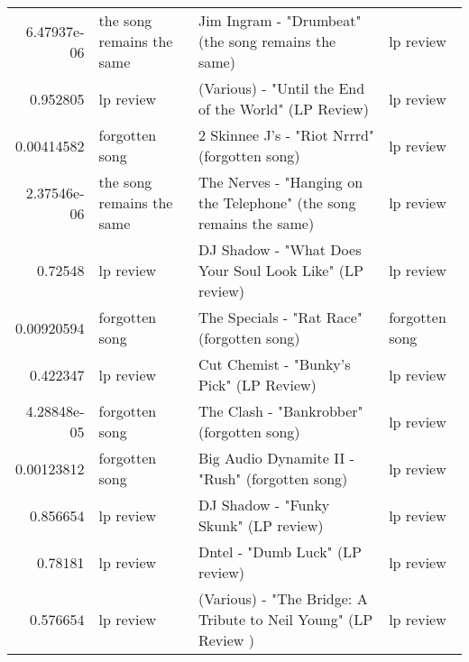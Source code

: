 \documentclass[letterpaper,10pt]{article}
\begin{document}
\begin{table}[H]
\begin{adjustbox}{max width=\linewidth}
\begin{tabular}{rlll}
  6.47937e-06 & the song remains the same & Jim Ingram - "Drumbeat" (the song remains the same)                                                          & lp review                 \\
  0.952805    & lp review                 & (Various) - "Until the End of the World" (LP Review)                                                         & lp review                 \\
  0.00414582  & forgotten song            & 2 Skinnee J's - "Riot Nrrrd" (forgotten song)                                                                & lp review                 \\
  2.37546e-06 & the song remains the same & The Nerves - "Hanging on the Telephone" (the song remains the same)                                          & lp review                 \\
  0.72548     & lp review                 & DJ Shadow - "What Does Your Soul Look Like" (LP review)                                                      & lp review                 \\
  0.00920594  & forgotten song            & The Specials - "Rat Race" (forgotten song)                                                                   & forgotten song            \\
  0.422347    & lp review                 & Cut Chemist - "Bunky's Pick" (LP Review)                                                                     & lp review                 \\
  4.28848e-05 & forgotten song            & The Clash - "Bankrobber" (forgotten song)                                                                    & lp review                 \\
  0.00123812  & forgotten song            & Big Audio Dynamite II - "Rush" (forgotten song)                                                              & lp review                 \\
  0.856654    & lp review                 & DJ Shadow - "Funky Skunk" (LP review)                                                                        & lp review                 \\
  0.78181     & lp review                 & Dntel - "Dumb Luck" (LP review)                                                                              & lp review                 \\
  0.576654    & lp review                 & (Various) - "The Bridge: A Tribute to Neil Young" (LP Review  )                                              & lp review                 \\

\end{tabular}
\end{adjustbox}
\end{table}
\end{document}
